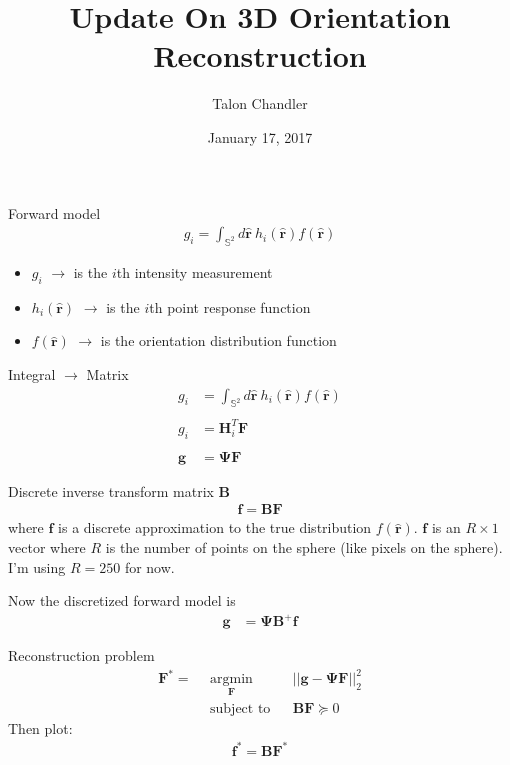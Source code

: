 \documentclass[presentation]{beamer}
\author{Talon Chandler}
\date{January 17, 2017}
\title{Update On 3D Orientation Reconstruction}
\begin{document}
\maketitle
\begin{frame}[label=sec-1]{Forward model}
\begin{align*}
g_i = \int_{\mathbb{S}^2}d\hat{\textbf{r}}\ h_i(\hat{\textbf{r}})f(\hat{\textbf{r}})
\end{align*}
\begin{itemize}
\item $g_i$ $\rightarrow$ is the $i$th intensity measurement
\item $h_i(\hat{\textbf{r}})$ $\rightarrow$ is the $i$th point response function
\item $f(\hat{\textbf{r}})$ $\rightarrow$ is the orientation distribution function
\end{itemize}
\end{frame}

\begin{frame}{Integral $\rightarrow$ Matrix}
  \begin{align*}
  g_i &= \int_{\mathbb{S}^2}d\hat{\textbf{r}}\ h_i(\hat{\textbf{r}})f(\hat{\textbf{r}})\\ \\
  g_i &= \textbf{H}_i^T\textbf{F}\\ \\
  \mathbf{g} &= \mathbf{\Psi}\textbf{F}
  \end{align*}
\end{frame}

\begin{frame}{Discrete inverse transform matrix $\mathbf{B}$}
  \begin{align*}
    \mathbf{f} = \mathbf{B}\mathbf{F}
  \end{align*}
  where $\mathbf{f}$ is a discrete approximation to the true distribution
  $f(\hat{\textbf{r}})$. $\mathbf{f}$ is an $R\times 1$ vector where $R$ is
  the number of points on the sphere (like pixels on the sphere). I'm using $R=250$ for now. \vspace{3em}

  Now the discretized forward model is 
  \begin{align*}
    \mathbf{g} &= \mathbf{\Psi}\mathbf{B}^{+}\mathbf{f}
  \end{align*}
\end{frame}

\begin{frame}{Reconstruction problem}
  \begin{equation*}
    \begin{aligned}
      \mathbf{F^*} =\ \  
    & \underset{\mathbf{F}}{\text{argmin}}
    & & ||\mathbf{g} - \mathbf{\Psi}\mathbf{F}||_2^2 \\
    & \text{subject to}
    & & \mathbf{B}\mathbf{F} \succeq 0
    \end{aligned}
  \end{equation*}
  Then plot:
  \begin{align*}
    \mathbf{f}^{*} = \mathbf{B}\mathbf{F}^*
  \end{align*}
\end{frame}
\end{document}
